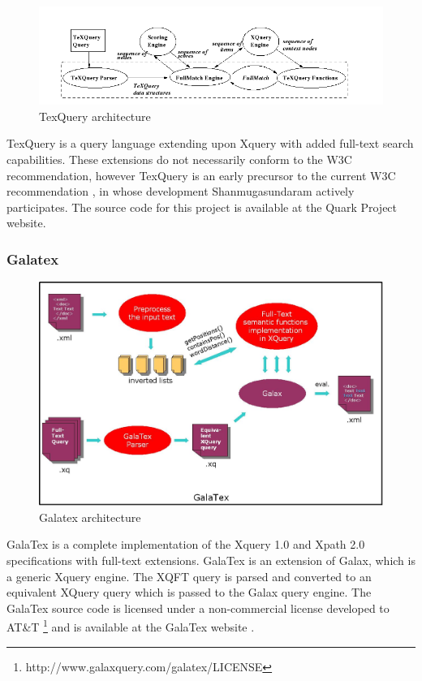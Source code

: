\begin{figure}[!h]
  \centering
    \includegraphics[width=1\textwidth]{img/texquery_architecture.png}
  \caption{TexQuery architecture}
\end{figure}

TexQuery is a query language extending upon Xquery with added full-text search 
capabilities. These extensions do not necessarily conform to the W3C
recommendation, however TexQuery is an early precursor to the current W3C 
recommendation \cite{TEXQ00}, in whose development Shanmugasundaram actively 
participates. The source code for this project is available at the Quark Project
website\cite{quarkproject}.

\subsubsection{Galatex}
\begin{figure}[!h]
  \centering
    \includegraphics[width=1\textwidth]{img/galatex_architecture.png}
  \caption{Galatex architecture}
\end{figure}

GalaTex is a complete implementation of the Xquery 1.0 and Xpath 2.0
specifications with full-text extensions. GalaTex is an extension of Galax,
which is a generic Xquery engine. The XQFT query is parsed and converted to an
equivalent XQuery query which is passed to the Galax query engine. The GalaTex
source code is licensed under a non-commercial license developed to AT\&{}T 
\footnote{http://www.galaxquery.com/galatex/LICENSE} and is available at the
GalaTex website \cite{galatex}.

